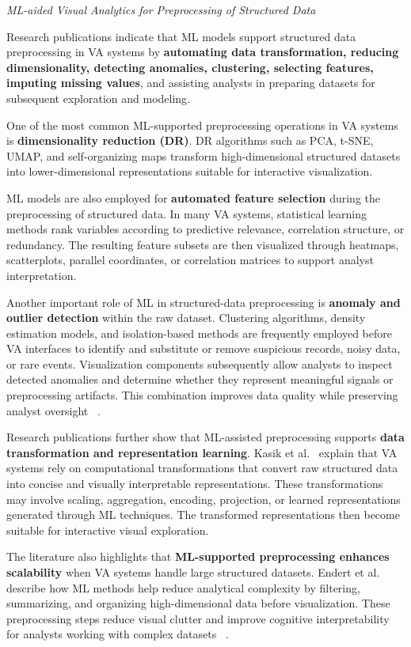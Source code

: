 \documentclass{sfuthesis}
\begin{document}
\noindent\textit{ML-aided Visual Analytics for Preprocessing of Structured Data}\par
Research publications indicate that ML models support structured data preprocessing in VA systems by \textbf{automating data transformation, reducing dimensionality, detecting anomalies, clustering, selecting features, imputing missing values}, and assisting analysts in preparing datasets for subsequent exploration and modeling.\par
One of the most common ML-supported preprocessing operations in VA systems is \textbf{dimensionality reduction (DR)}. DR algorithms such as PCA, t-SNE, UMAP, and self-organizing maps transform high-dimensional structured datasets into lower-dimensional representations suitable for interactive visualization.\par
ML models are also employed for \textbf{automated feature selection} during the preprocessing of structured data. In many VA systems, statistical learning methods rank variables according to predictive relevance, correlation structure, or redundancy. The resulting feature subsets are then visualized through heatmaps, scatterplots, parallel coordinates, or correlation matrices to support analyst interpretation.\par
Another important role of ML in structured-data preprocessing is \textbf{anomaly and outlier detection} within the raw dataset. Clustering algorithms, density estimation models, and isolation-based methods are frequently employed before VA interfaces to identify and substitute or remove suspicious records, noisy data, or rare events. Visualization components subsequently allow analysts to inspect detected anomalies and determine whether they represent meaningful signals or preprocessing artifacts. This combination improves data quality while preserving analyst oversight ~\cite{endert_state_2017}.\par
Research publications further show that ML-assisted preprocessing supports \textbf{data transformation and representation learning}. Kasik et al.~\cite{kasik_data_2009} explain that VA systems rely on computational transformations that convert raw structured data into concise and visually interpretable representations. These transformations may involve scaling, aggregation, encoding, projection, or learned representations generated through ML techniques. The transformed representations then become suitable for interactive visual exploration.\par
The literature also highlights that \textbf{ML-supported preprocessing enhances scalability} when VA systems handle large structured datasets. Endert et al.~\cite{endert_state_2017} describe how ML methods help reduce analytical complexity by filtering, summarizing, and organizing high-dimensional data before visualization. These preprocessing steps reduce visual clutter and improve cognitive interpretability for analysts working with complex datasets ~\cite{endert_state_2017}.\par
\end{document}
